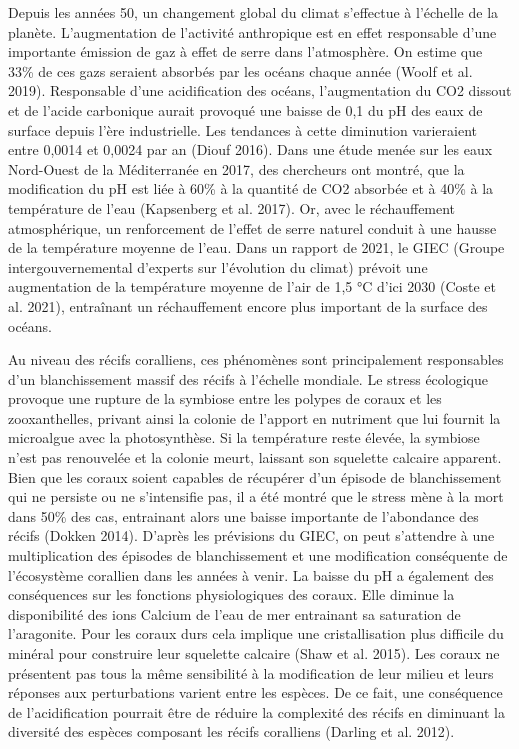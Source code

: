 \documentclass[]{article}
\begin{document}
Depuis les années 50, un changement global du climat s'effectue à
l'échelle de la planète. L'augmentation de l'activité anthropique est en
effet responsable d'une importante émission de gaz à effet de serre dans
l'atmosphère. On estime que 33\% de ces gazs seraient absorbés par les
océans chaque année (Woolf et al. 2019). Responsable d'une acidification
des océans, l'augmentation du CO2 dissout et de l'acide carbonique
aurait provoqué une baisse de 0,1 du pH des eaux de surface depuis l'ère
industrielle. Les tendances à cette diminution varieraient entre 0,0014
et 0,0024 par an (Diouf 2016). Dans une étude menée sur les eaux
Nord-Ouest de la Méditerranée en 2017, des chercheurs ont montré, que la
modification du pH est liée à 60\% à la quantité de CO2 absorbée et à
40\% à la température de l'eau (Kapsenberg et al. 2017). Or, avec le
réchauffement atmosphérique, un renforcement de l'effet de serre naturel
conduit à une hausse de la température moyenne de l'eau. Dans un rapport
de 2021, le GIEC (Groupe intergouvernemental d'experts sur l'évolution
du climat) prévoit une augmentation de la température moyenne de l'air
de 1,5 °C d'ici 2030 (Coste et al. 2021), entraînant un réchauffement
encore plus important de la surface des océans.

Au niveau des récifs coralliens, ces phénomènes sont principalement
responsables d'un blanchissement massif des récifs à l'échelle mondiale.
Le stress écologique provoque une rupture de la symbiose entre les
polypes de coraux et les zooxanthelles, privant ainsi la colonie de
l'apport en nutriment que lui fournit la microalgue avec la
photosynthèse. Si la température reste élevée, la symbiose n'est pas
renouvelée et la colonie meurt, laissant son squelette calcaire
apparent. Bien que les coraux soient capables de récupérer d'un épisode
de blanchissement qui ne persiste ou ne s'intensifie pas, il a été
montré que le stress mène à la mort dans 50\% des cas, entrainant alors
une baisse importante de l'abondance des récifs (Dokken 2014). D'après
les prévisions du GIEC, on peut s'attendre à une multiplication des
épisodes de blanchissement et une modification conséquente de
l'écosystème corallien dans les années à venir. La baisse du pH a
également des conséquences sur les fonctions physiologiques des coraux.
Elle diminue la disponibilité des ions Calcium de l'eau de mer
entrainant sa saturation de l'aragonite. Pour les coraux durs cela
implique une cristallisation plus difficile du minéral pour construire
leur squelette calcaire (Shaw et al. 2015). Les coraux ne présentent pas
tous la même sensibilité à la modification de leur milieu et leurs
réponses aux perturbations varient entre les espèces. De ce fait, une
conséquence de l'acidification pourrait être de réduire la complexité
des récifs en diminuant la diversité des espèces composant les récifs
coralliens (Darling et al. 2012).
\end{document}
